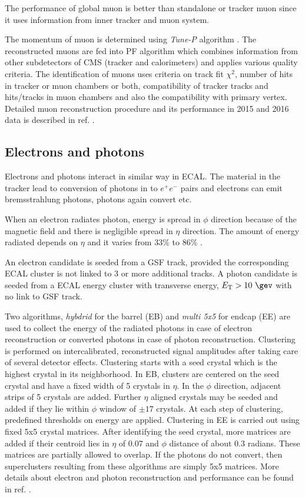 The performance of global muon is better than standalone or tracker muon since it uses information from inner tracker and muon system.

The momentum of muon is determined using \textit{Tune-P} algorithm \cite{Chatrchyan:2012xi}. The reconstructed muons are fed into PF 
algorithm which combines information from other subdetectors of CMS (tracker and calorimeters) and applies various quality criteria. The identification of muons uses 
criteria on track fit $\chi^2$, number of hits in tracker or muon chambers or both, compatibility of tracker tracks and hits/tracks in 
muon chambers and also the  compatibility with primary vertex. Detailed muon reconstruction procedure and its performance in 2015 and 2016 
data is described in ref. \cite{Sirunyan:2018fpa}.

\subsection{Electrons and photons}
Electrons and photons interact in similar way in ECAL. The material in the tracker lead to conversion of photons in to $e^+e^-$ pairs and 
electrons can emit bremsstrahlung photons, photons again convert etc.

When an electron radiates photon, energy is spread in $\phi$ direction because of the magnetic field and there is negligible spread in 
$\eta$ direction. The amount of energy radiated depends on $\eta$ and it varies from 33\% to 86\% \cite{Khachatryan:2015hwa}.

An electron candidate is seeded from a GSF track, provided the corresponding ECAL cluster is not linked to 3 or more additional tracks. A 
photon candidate is seeded from a ECAL energy cluster with transverse energy, $\et > 10\ \gev$ with no link to GSF track.

Two algorithms, \textit{hybdrid} for the barrel (EB) and \textit{multi 5x5} for endcap (EE) \cite{Khachatryan:2015hwa} are used to collect 
the energy of the radiated photons in case of electron reconstruction or converted photons in case of photon reconstruction. Clustering is 
performed  on intercalibrated, reconstructed signal amplitudes after taking care of several detector effects. Clustering starts with a 
seed crystal which is the highest \et crystal in its neighborhood. In EB, clusters are centered on the seed crystal and have a fixed width 
of 5 crystals in $\eta$. In the $\phi$ direction, adjacent strips of 5 crystals are added. Further $\eta$ aligned crystals may be seeded 
and added if they lie within $\phi$ window of $\pm17$ crystals. At each step of clustering, predefined thresholds on energy are applied. 
Clustering in EE is carried out using fixed 5x5 crystal matrices. After identifying the seed crystal, more matrices are added if their 
centroid lies in  $\eta$ of 0.07 and $\phi$ distance of about 0.3 radians. These matrices are partially allowed to overlap. If the photons 
do not convert, then superclusters resulting from these algorithms are simply 5x5 matrices. More details about electron and photon 
reconstruction and performance can be found in ref. \cite{Khachatryan:2015hwa,CMS:EGM-14-001}.

